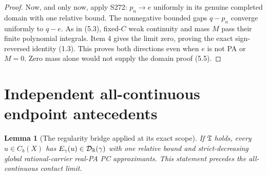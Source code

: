 \documentclass[11pt]{article}
\newtheorem{lemma}[theorem]{Lemma}
\begin{document}
\begin{proof}
Now, and only now, apply S272: $p_n\to e$ uniformly in its genuine completed domain with one relative bound. The nonnegative bounded gaps $q-p_n$ converge uniformly to $q-e$. As in (5.3), fixed-$C$ weak continuity and mass $M$ pass their finite polynomial integrals. Item 4 gives the limit zero, proving the exact sign-reversed identity (1.3). This proves both directions even when $e$ is not PA or $M=0$. Zero mass alone would not supply the domain proof (5.5).
\end{proof}

\section{Independent all-continuous endpoint antecedents}
\begin{lemma}[The regularity bridge applied at its exact scope]\label{l:domain}
If $\mathfrak T$ holds, every $u\in C_b(X)$ has $E_\gamma(u)\in\mathcal D_\mathbb R(\gamma)$ with one relative bound and strict-decreasing global rational-carrier real-PA PC approximants. This statement precedes the all-continuous contact limit.
\end{lemma}
\end{document}

